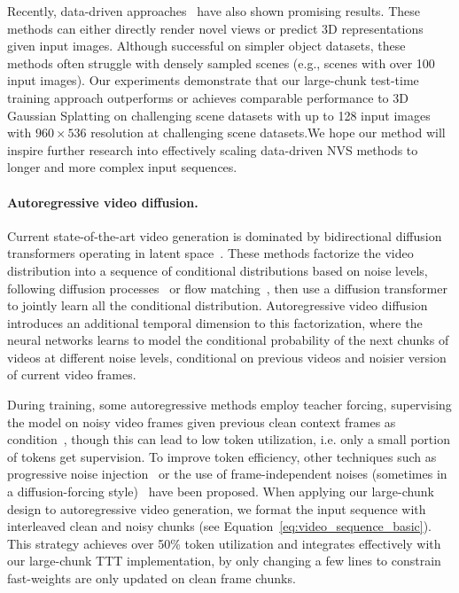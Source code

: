 Recently, data-driven approaches~\cite{zhang2024gs, jin2024lvsm, ziwen2024long, liu2023zero} have also shown promising results. These methods can either directly render novel views or predict 3D representations given input images. Although successful on simpler object datasets, these methods often struggle with densely sampled scenes (e.g., scenes with over 100 input images).  Our experiments demonstrate that our large-chunk test-time training approach outperforms or achieves comparable performance to 3D Gaussian Splatting on challenging scene datasets with up to 128 input images with $960\times536$ resolution at challenging scene datasets.We hope our method will inspire further research into effectively scaling data-driven NVS methods to longer and more complex input sequences.



\paragraph{Autoregressive video diffusion.}
Current state-of-the-art video generation is dominated by bidirectional diffusion transformers operating in latent space~\cite{videoworldsimulators2024, yang2024cogvideox, polyak2410movie, wang2025wan}. These methods factorize the video distribution into a sequence of conditional distributions based on noise levels, following diffusion processes~\cite{sohl2015deep, song2020score} or flow matching~\cite{lipman2022flow}, then use a diffusion transformer to jointly learn all the conditional distribution. Autoregressive video diffusion~\cite{alonso2024diffusion, jin2024pyramidal, valevski2024diffusion, ruhe2024rolling, yin2024slow, song2025history} introduces an additional temporal dimension to this factorization, where the neural networks learns to model the conditional probability of the next chunks of videos at different noise levels, conditional on previous videos and noisier  version of current video frames.  

During training, some autoregressive methods employ teacher forcing, supervising the model on noisy video frames given previous  clean context frames as condition~\cite{alonso2024diffusion,jin2024pyramidal,valevski2024diffusion}, though this can lead to low token utilization, i.e. only a small portion of tokens get supervision. To improve token efficiency, other techniques such as progressive noise injection~\cite{ruhe2024rolling} or the use of frame-independent noises (sometimes in a diffusion-forcing style)~\cite{yin2024slow, chen2024diffusion, magi1} have been proposed. When applying our large-chunk design to autoregressive video generation, we format the input sequence with interleaved clean and noisy chunks (see Equation~\ref{eq:video_sequence_basic}). This strategy achieves over 50\% token utilization and integrates effectively with our large-chunk TTT implementation, by only changing a few lines to constrain fast-weights are only updated on clean frame chunks.